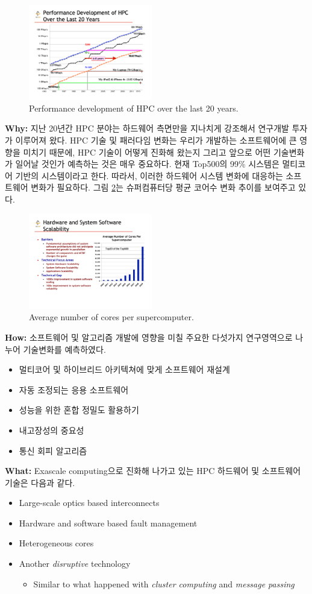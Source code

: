 \documentclass[twocolumn]{article}
\newcommand{\bi}{\begin{itemize}}
\newcommand{\ei}{\end{itemize}}
\newcommand{\ii}{\item}
\begin{document}
\begin{figure}[htb]
        \centering
        \includegraphics[width=0.48\textwidth]{hpc-20-years.pdf}
        \caption{Performance development of HPC over the last 20 years.}
        \label{fig:hpc_20}
\end{figure}
\noindent
\textbf{Why:}  지난 20년간 HPC 분야는 하드웨어 측면만을 지나치게 강조해서 연구개발 투자가 이루어져 왔다. HPC 기술 및 패러다임 변화는 우리가 개발하는 소프트웨어에 큰 영향을 미치기 때문에, HPC 기술이 어떻게 진화해 왔는지 그리고 앞으로 어떤 기술변화가 일어날 것인가 예측하는 것은 매우 중요하다. 현재 Top500의 99\% 시스템은 멀티코어 기반의 시스템이라고 한다. 따라서, 이러한 하드웨어 시스템 변화에 대응하는 소프트웨어 변화가 필요하다. 그림 \ref{fig:hpc_cores}는 슈퍼컴퓨터당 평균 코어수 변화 추이를 보여주고 있다.

\begin{figure}[htb]
        \centering
        \includegraphics[width=0.48\textwidth]{hpc_cores.pdf}
        \caption{Average number of cores per supercomputer.}
        \label{fig:hpc_cores}
\end{figure}

\noindent
\textbf{How:}  소프트웨어 및 알고리즘 개발에 영향을 미칠 주요한 다섯가지 연구영역으로 나누어 기술변화를 예측하였다.
\bi
\ii 멀티코어 및 하이브리드 아키텍쳐에 맞게 소프트웨어 재설계 
\ii 자동 조정되는 응용 소프트웨어
\ii  성능을 위한 혼합 정밀도 활용하기
\ii 내고장성의 중요성
\ii 통신 회피 알고리즘
\ei

\noindent
\textbf{What:} Exascale computing으로 진화해 나가고 있는 HPC 하드웨어 및 소프트웨어 기술은 다음과 같다.
\bi
\ii Large-scale optics based interconnects
\ii Hardware and software based fault management
\ii Heterogeneous cores
\ii Another \textit{disruptive} technology
\bi
\ii Similar to what happened with \textit{cluster computing} and \textit{message passing}
\ei
\ei
\end{document}
